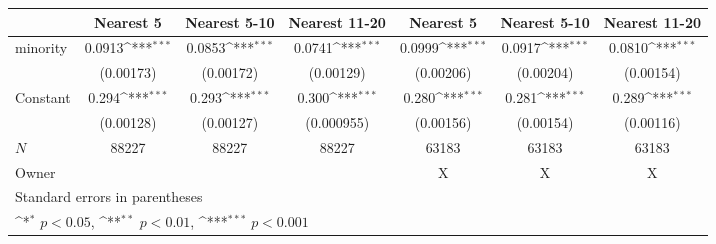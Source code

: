 {
\def\sym#1{\ifmmode^{#1}\else\(^{#1}\)\fi}
\begin{tabular}{l*{6}{c}}
\hline\hline
            &\multicolumn{1}{c}{Nearest 5}&\multicolumn{1}{c}{Nearest 5-10}&\multicolumn{1}{c}{Nearest 11-20}&\multicolumn{1}{c}{Nearest 5}&\multicolumn{1}{c}{Nearest 5-10}&\multicolumn{1}{c}{Nearest 11-20}\\
\hline
minority    &      0.0913\sym{***}&      0.0853\sym{***}&      0.0741\sym{***}&      0.0999\sym{***}&      0.0917\sym{***}&      0.0810\sym{***}\\
            &   (0.00173)         &   (0.00172)         &   (0.00129)         &   (0.00206)         &   (0.00204)         &   (0.00154)         \\
[1em]
Constant    &       0.294\sym{***}&       0.293\sym{***}&       0.300\sym{***}&       0.280\sym{***}&       0.281\sym{***}&       0.289\sym{***}\\
            &   (0.00128)         &   (0.00127)         &  (0.000955)         &   (0.00156)         &   (0.00154)         &   (0.00116)         \\
\hline
\(N\)       &       88227         &       88227         &       88227         &       63183         &       63183         &       63183         \\
Owner       &                     &                     &                     &           X         &           X         &           X         \\
\hline\hline
\multicolumn{7}{l}{\footnotesize Standard errors in parentheses}\\
\multicolumn{7}{l}{\footnotesize \sym{*} \(p<0.05\), \sym{**} \(p<0.01\), \sym{***} \(p<0.001\)}\\
\end{tabular}
}
